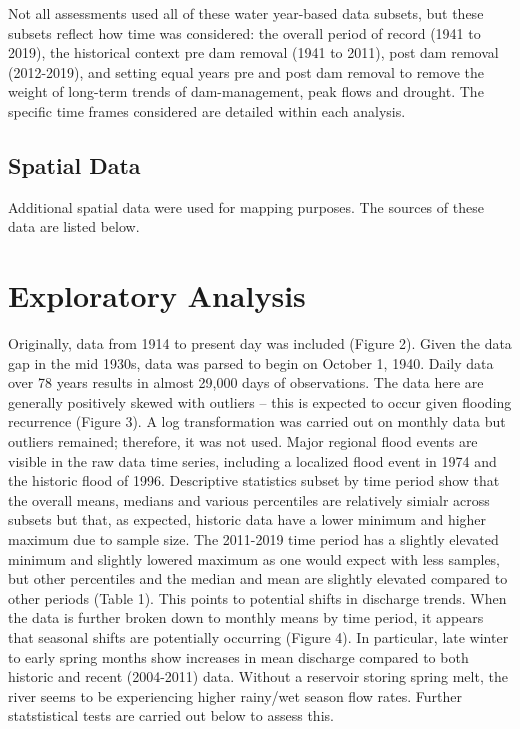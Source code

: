 \documentclass[
  12pt,
]{article}
\begin{document}
Not all assessments used all of these water year-based data subsets, but
these subsets reflect how time was considered: the overall period of
record (1941 to 2019), the historical context pre dam removal (1941 to
2011), post dam removal (2012-2019), and setting equal years pre and
post dam removal to remove the weight of long-term trends of
dam-management, peak flows and drought. The specific time frames
considered are detailed within each analysis.

\hypertarget{spatial-data}{%
\subsection{Spatial Data}\label{spatial-data}}

Additional spatial data were used for mapping purposes. The sources of
these data are listed below.

\newpage

\hypertarget{exploratory-analysis}{%
\section{Exploratory Analysis}\label{exploratory-analysis}}

Originally, data from 1914 to present day was included (Figure 2). Given
the data gap in the mid 1930s, data was parsed to begin on October 1,
1940. Daily data over 78 years results in almost 29,000 days of
observations. The data here are generally positively skewed with
outliers -- this is expected to occur given flooding recurrence (Figure
3). A log transformation was carried out on monthly data but outliers
remained; therefore, it was not used. Major regional flood events are
visible in the raw data time series, including a localized flood event
in 1974 and the historic flood of 1996. Descriptive statistics subset by
time period show that the overall means, medians and various percentiles
are relatively simialr across subsets but that, as expected, historic
data have a lower minimum and higher maximum due to sample size. The
2011-2019 time period has a slightly elevated minimum and slightly
lowered maximum as one would expect with less samples, but other
percentiles and the median and mean are slightly elevated compared to
other periods (Table 1). This points to potential shifts in discharge
trends. When the data is further broken down to monthly means by time
period, it appears that seasonal shifts are potentially occurring
(Figure 4). In particular, late winter to early spring months show
increases in mean discharge compared to both historic and recent
(2004-2011) data. Without a reservoir storing spring melt, the river
seems to be experiencing higher rainy/wet season flow rates. Further
statstistical tests are carried out below to assess this.
\end{document}
